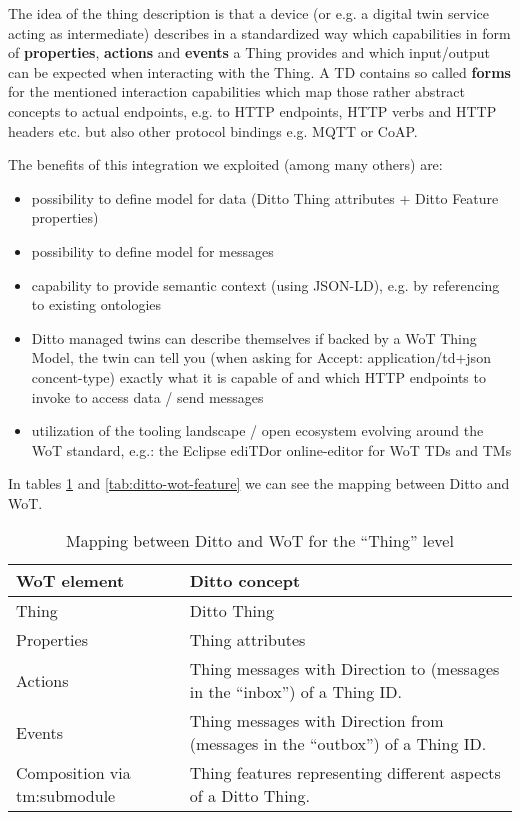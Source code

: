 The idea of the thing description is that a device (or e.g. a digital twin service acting as intermediate) describes in a standardized way which capabilities in form of \textbf{properties}, \textbf{actions} and \textbf{events} a Thing provides and which input/output can be expected when interacting with the Thing.
A TD contains so called \textbf{forms} for the mentioned interaction capabilities which map those rather abstract concepts to actual endpoints, e.g. to HTTP endpoints, HTTP verbs and HTTP headers etc. but also other protocol bindings e.g. MQTT or CoAP.

The benefits of this integration we exploited (among many others) are:
\begin{itemize}
    \item possibility to define model for data (Ditto Thing attributes + Ditto Feature properties)
    \item possibility to define model for messages
    \item capability to provide semantic context (using JSON-LD), e.g. by referencing to existing ontologies
    \item Ditto managed twins can describe themselves if backed by a WoT Thing Model, the twin can tell you (when asking for Accept: application/td+json concent-type) exactly what it is capable of and which HTTP endpoints to invoke to access data / send messages
    \item utilization of the tooling landscape / open ecosystem evolving around the WoT standard, e.g.:
    the Eclipse edi{TD}or online-editor for WoT TDs and TMs
\end{itemize}

In tables \ref{tab:ditto-wot-thing} and \ref{tab:ditto-wot-feature} we can see the mapping between Ditto and WoT.

\begin{table}[H]
    \begin{tabular}{|p{}|p{}|}
    \hline
    \textbf{WoT element} & \textbf{Ditto concept} \\ \hline
    Thing & Ditto Thing\\ \hline
    Properties & Thing attributes\\ \hline
    Actions & Thing messages with Direction to (messages in the ``inbox'') of a Thing ID.\\ \hline
    Events & 	Thing messages with Direction from (messages in the “outbox”) of a Thing ID.\\ \hline
    Composition via tm:submodule & Thing features representing different aspects of a Ditto Thing.\\ \hline
    \end{tabular}
    \caption{Mapping between Ditto and WoT for the ``Thing'' level}
    \label{tab:ditto-wot-thing}
\end{table}

